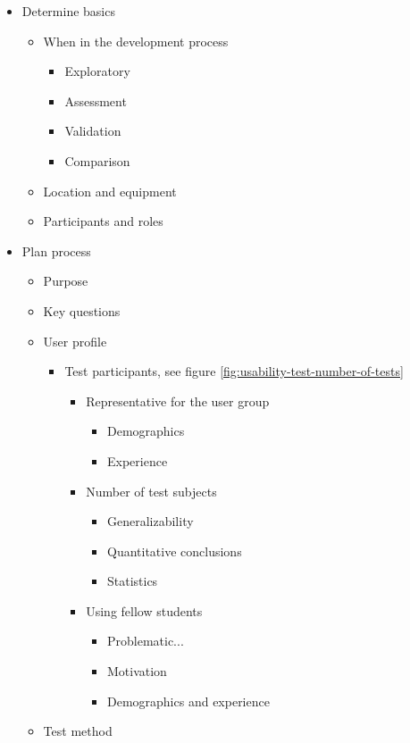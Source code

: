 \begin{itemize}
	\item Determine basics
	\begin{itemize}
		\item When in the development process
		\begin{itemize}
			\item Exploratory
			\item Assessment
			\item Validation
			\item Comparison
		\end{itemize}
		\item Location and equipment
		\item Participants and roles
	\end{itemize}
	\item Plan process
	\begin{itemize}
		\item Purpose
		\item Key questions
		\item User profile
		\begin{itemize}
			\item Test participants, see figure \ref{fig:usability-test-number-of-tests}
			\begin{itemize}
				\item Representative for the user group
				\begin{itemize}
					\item Demographics
					\item Experience
				\end{itemize}
				\item Number of test subjects
				\begin{itemize}
					\item Generalizability
					\item Quantitative conclusions
					\item Statistics
				\end{itemize}
				\item Using fellow students
				\begin{itemize}
					\item Problematic...
					\item Motivation
					\item Demographics and experience
				\end{itemize}
			\end{itemize}
		\end{itemize}
		\item Test method

\end{itemize}
\end{itemize}
